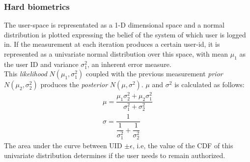 \documentclass[12pt]{article}			%
\begin{document}
\subsubsection{ Hard biometrics }
The user-space is representated as a 1-D dimensional space and a normal distribution is plotted expressing the belief of the system of which user is logged in. If the measurement at each iteration produces a certain user-id, it is represented as a univariate normal distribution over this space, with mean $\mu_{1}$ as the user ID and variance $\sigma_{1}^{2}$, an inherent error measure.\\
This \emph{likelihood} $N\left(\mu_{1}, \sigma_{1}^{2}\right)$ coupled with the previous measurement \emph{prior} $N\left(\mu_{2}, \sigma_{2}^{2}\right)$ produces the \emph{posterior} $N\left(\mu, \sigma^{2}\right)$. $\mu$ and $\sigma^{2}$ is calculated as follows:
\begin{align*}
	\mu = \dfrac {\mu_{1}\sigma_{2}^{2} + \mu_{2}\sigma_{1}^{2}} {\sigma_{1}^{2} + \sigma_{2}^{2}}\\[2ex]
	\sigma =\dfrac {1} {\dfrac {1} {\sigma_{1}^{2}}+\dfrac {1} {\sigma_{2}^{2}}}
\end{align*}
The area under the curve between UID $\pm \epsilon$, i.e, the value of the CDF of this univariate distribution determines if the user needs to remain authorized.
\end{document}
